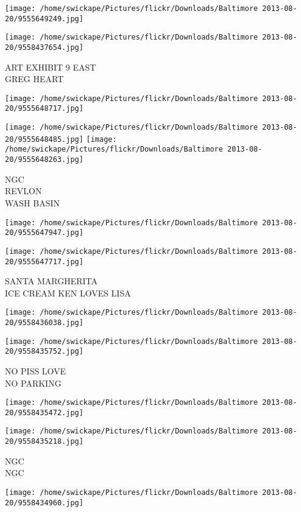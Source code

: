 \documentclass[10pt,letterpaper]{article}
\begin{document}
\texttt{[image: /home/swickape/Pictures/flickr/Downloads/Baltimore 2013-08-20/9555649249.jpg]}

\vspace{0.25in}
\texttt{[image: /home/swickape/Pictures/flickr/Downloads/Baltimore 2013-08-20/9558437654.jpg]}

ART EXHIBIT 9 EAST\\
GREG HEART
\pagebreak

\texttt{[image: /home/swickape/Pictures/flickr/Downloads/Baltimore 2013-08-20/9555648717.jpg]}

\vspace{0.25in}
\texttt{[image: /home/swickape/Pictures/flickr/Downloads/Baltimore 2013-08-20/9555648485.jpg]}
\texttt{[image: /home/swickape/Pictures/flickr/Downloads/Baltimore 2013-08-20/9555648263.jpg]}

NGC\\
REVLON\\
WASH BASIN
\pagebreak

\texttt{[image: /home/swickape/Pictures/flickr/Downloads/Baltimore 2013-08-20/9555647947.jpg]}

\vspace{0.25in}
\texttt{[image: /home/swickape/Pictures/flickr/Downloads/Baltimore 2013-08-20/9555647717.jpg]}

SANTA MARGHERITA\\
ICE CREAM KEN LOVES LISA
\pagebreak

\texttt{[image: /home/swickape/Pictures/flickr/Downloads/Baltimore 2013-08-20/9558436038.jpg]}

\vspace{0.25in}
\texttt{[image: /home/swickape/Pictures/flickr/Downloads/Baltimore 2013-08-20/9558435752.jpg]}

NO PISS LOVE\\
NO PARKING
\pagebreak

\texttt{[image: /home/swickape/Pictures/flickr/Downloads/Baltimore 2013-08-20/9558435472.jpg]}

\vspace{0.25in}
\texttt{[image: /home/swickape/Pictures/flickr/Downloads/Baltimore 2013-08-20/9558435218.jpg]}

NGC\\
NGC
\pagebreak

\texttt{[image: /home/swickape/Pictures/flickr/Downloads/Baltimore 2013-08-20/9558434960.jpg]}
\end{document}
